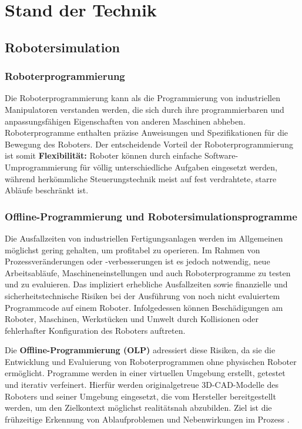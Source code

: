 
\chapter{Stand der Technik} \label{cap:Grundlagen}

\section{Robotersimulation}
\subsection{Roboterprogrammierung} Die Roboterprogrammierung kann als die
Programmierung von industriellen Manipulatoren verstanden werden, die sich durch
ihre programmierbaren und anpassungsfähigen Eigenschaften von anderen Maschinen
abheben. Roboterprogramme enthalten präzise Anweisungen und Spezifikationen für
die Bewegung des Roboters.  Der entscheidende
Vorteil der Roboterprogrammierung ist somit \textbf{Flexibilität:} Roboter
können durch einfache Software-Umprogrammierung für völlig unterschiedliche
Aufgaben eingesetzt werden, während herkömmliche Steuerungstechnik meist auf
fest verdrahtete, starre Abläufe beschränkt ist.

\subsection{Offline-Programmierung und Robotersimulationsprogramme} Die
Ausfallzeiten von industriellen Fertigungsanlagen werden im Allgemeinen
möglichst gering gehalten, um profitabel zu operieren. Im Rahmen von
Prozessveränderungen oder -verbesserungen ist es jedoch notwendig, neue
Arbeitsabläufe, Maschineneinstellungen und auch Roboterprogramme zu testen und
zu evaluieren. Das impliziert erhebliche Ausfallzeiten sowie finanzielle und
sicherheitstechnische Risiken bei der Ausführung von noch nicht evaluiertem
Programmcode auf einem Roboter. Infolgedessen können Beschädigungen am
Roboter, Maschinen, Werkstücken und Umwelt durch Kollisionen oder fehlerhafter
Konfiguration des Roboters auftreten.


Die \textbf{Offline-Programmierung (OLP)} adressiert diese Risiken, da sie die
Entwicklung und Evaluierung von Roboterprogrammen ohne physischen Roboter
ermöglicht. Programme werden in einer virtuellen Umgebung erstellt, getestet und
iterativ verfeinert. Hierfür werden originalgetreue 3D-CAD-Modelle des Roboters
und seiner Umgebung eingesetzt, die vom Hersteller bereitgestellt werden, um den
Zielkontext möglichst realitätsnah abzubilden. Ziel ist die frühzeitige
Erkennung von Ablaufproblemen und Nebenwirkungen im Prozess
.

